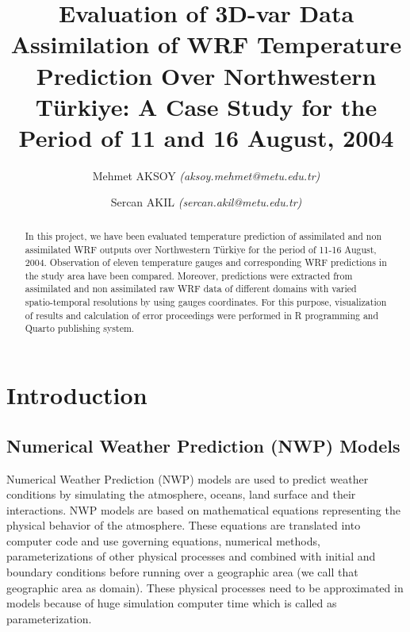 \documentclass[
  letterpaper,
  DIV=11,
  numbers=noendperiod,
  abstract]{scrartcl}
\title{Evaluation of 3D-var Data Assimilation of WRF Temperature
Prediction Over Northwestern Türkiye: A Case Study for the Period of 11
and 16 August, 2004}
\author{Mehmet AKSOY \emph{(aksoy.mehmet@metu.edu.tr)} \and Sercan AKIL
\emph{(sercan.akil@metu.edu.tr)}}
\date{}
\renewcommand*\contentsname{Table of contents}
\newcommand\contentsname{Table of contents}
\begin{document}
\maketitle
\begin{abstract}
In this project, we have been evaluated temperature prediction of
assimilated and non assimilated WRF outputs over Northwestern Türkiye
for the period of 11-16 August, 2004. Observation of eleven temperature
gauges and corresponding WRF predictions in the study area have been
compared. Moreover, predictions were extracted from assimilated and non
assimilated raw WRF data of different domains with varied
spatio-temporal resolutions by using gauges coordinates. For this
purpose, visualization of results and calculation of error proceedings
were performed in R programming and Quarto publishing system.
\end{abstract}
\ifdefined\Shaded\renewenvironment{Shaded}{\begin{tcolorbox}[frame hidden, breakable, sharp corners, colback={codebgcolor}, borderline west={3pt}{0pt}{shadecolor}, enhanced, boxrule=0pt]}{\end{tcolorbox}}\fi

\renewcommand*\contentsname{Table of contents}
{
\hypersetup{linkcolor=}
\setcounter{tocdepth}{3}
\tableofcontents
}
\listoffigures
\listoftables
\hypertarget{introduction}{%
\section{Introduction}\label{introduction}}

\hypertarget{numerical-weather-prediction-nwp-models}{%
\subsection{Numerical Weather Prediction (NWP)
Models}\label{numerical-weather-prediction-nwp-models}}

Numerical Weather Prediction (NWP) models are used to predict weather
conditions by simulating the atmosphere, oceans, land surface and their
interactions. NWP models are based on mathematical equations
representing the physical behavior of the atmosphere. These equations
are translated into computer code and use governing equations, numerical
methods, parameterizations of other physical processes and combined with
initial and boundary conditions before running over a geographic area
(we call that geographic area as domain). These physical processes need
to be approximated in models because of huge simulation computer time
which is called as parameterization.
\end{document}
